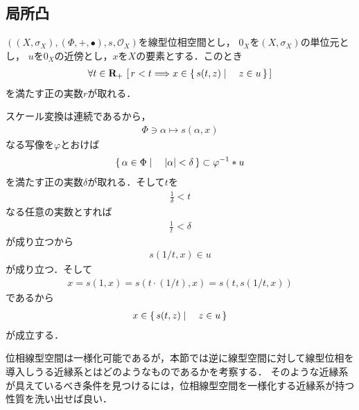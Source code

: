\subsection{局所凸}
	\begin{screen}
		\begin{thm}[ゼロの近傍をスケール変換すれば空間全体を覆うことが出来る]
		\label{thm:neighbor_of_zero_is_absorbing}
			$\left(\left(X,\sigma_X\right),(\Phi,+,\bullet),s,\mathscr{O}_X\right)$を線型位相空間とし，
			$0_X$を$\left(X,\sigma_X\right)$の単位元とし，
			$u$を$0_X$の近傍とし，$x$を$X$の要素とする．このとき
			\begin{align}
				\forall t \in \mathbf{R}_+\,
				\left[\, r < t \Longrightarrow x \in \left\{\, s(t,z) \mid \quad z \in u\, \right\}\, \right]
			\end{align}
			を満たす正の実数$r$が取れる．
		\end{thm}
	\end{screen}
	
	\begin{sketch}
		スケール変換は連続であるから，
		\begin{align}
			\Phi \ni \alpha \longmapsto s(\alpha,x)
		\end{align}
		なる写像を$\varphi$とおけば
		\begin{align}
			\left\{\, \alpha \in \Phi \mid \quad |\alpha| < \delta\, \right\} \subset \varphi^{-1} \ast u
		\end{align}
		を満たす正の実数$\delta$が取れる．そして$t$を
		\begin{align}
			\frac{1}{\delta} < t
		\end{align}
		なる任意の実数とすれば
		\begin{align}
			\frac{1}{t} < \delta
		\end{align}
		が成り立つから
		\begin{align}
			s(1/t,x) \in u
		\end{align}
		が成り立つ．そして
		\begin{align}
			x = s\left(1,x\right) = s\left(t \cdot (1/t),x\right) = s\left(t,s\left(1/t,x\right)\right)
		\end{align}
		であるから
		\begin{align}
			x \in \left\{\, s(t,z) \mid \quad z \in u\, \right\}
		\end{align}
		が成立する．
		\QED
	\end{sketch}
	
	位相線型空間は一様化可能であるが，本節では逆に線型空間に対して線型位相を導入しうる近縁系とはどのようなものであるかを考察する．
	そのような近縁系が具えているべき条件を見つけるには，位相線型空間を一様化する近縁系が持つ性質を洗い出せば良い．
	
